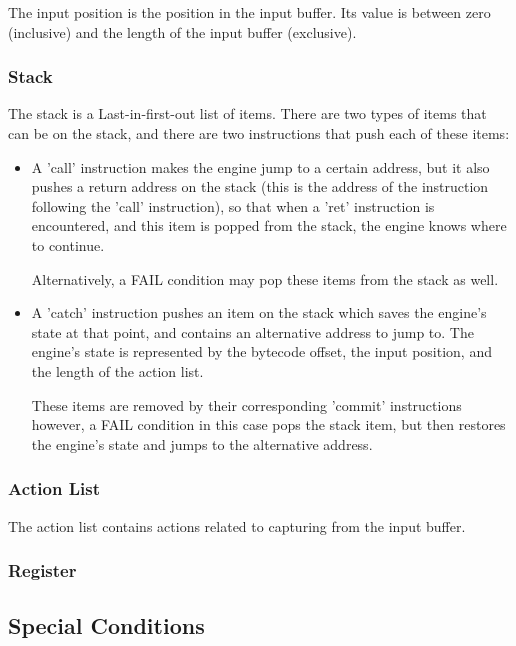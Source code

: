 The input position is the position in the input buffer. Its value
is between zero (inclusive) and the length of the input buffer (exclusive).

\subsubsection{Stack}

The stack is a Last-in-first-out list of items. There are two types
of items that can be on the stack, and there are two instructions that
push each of these items:

\begin{itemize}

\item A 'call' instruction makes the engine jump to a certain address,
but it also pushes a return address on the stack
(this is the address of the instruction following the 'call' instruction),
so that when a 'ret' instruction is encountered,
and this item is popped from the stack, the engine knows where to continue.

Alternatively, a FAIL condition may pop these items from the stack as well.

\item A 'catch' instruction pushes an item on the stack which saves the
engine's state at that point, and contains an alternative address to jump
to. The engine's state is represented by the bytecode offset, the input
position, and the length of the action list.

These items are removed by their corresponding 'commit' instructions however,
a FAIL condition in this case pops the stack item, but then restores the
engine's state and jumps to the alternative address.

\end{itemize}

\subsubsection{Action List}

The action list contains actions related to capturing from the input buffer.

\subsubsection{Register}

\subsection{Special Conditions}

